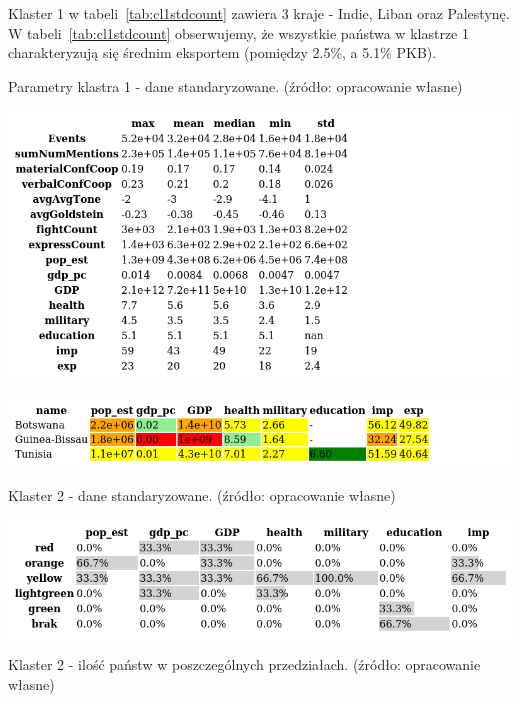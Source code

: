 \documentclass[11pt]{report}
\begin{document}
    Klaster 1 w tabeli~\ref{tab:cl1stdcount} zawiera 3 kraje - Indie, Liban oraz Palestynę.
    W tabeli~\ref{tab:cl1stdcount} obserwujemy, że wszystkie państwa w klastrze 1 charakteryzują się średnim eksportem (pomiędzy 2.5\%, a 5.1\% PKB).

    \begin{table}[!htp]
        \centering
        \caption{Parametry klastra 1 - dane standaryzowane. (źródło: opracowanie własne)}
        \label{tab:cl1std_desc}
        \includegraphics[width=\linewidth]{tables/CLUST/desc/clust1std_desc.png}
    \end{table}

    \begin{table}[!htp]
        \centering
        \includegraphics[width=\linewidth]{tables/CLUST/cluster2stdkmeans.png}
        \caption{Klaster 2 - dane standaryzowane. (źródło: opracowanie własne)}
        \label{tab:cl2std}
    \end{table}

    \begin{table}[!htp]
        \centering
        \includegraphics[width=\linewidth]{tables/CLUST/cluster2stdkmeanscount.png}
        \caption{Klaster 2 - ilość państw w poszczególnych przedziałach. (źródło: opracowanie własne)}
        \label{tab:cl2stdcount}
    \end{table}
\end{document}
